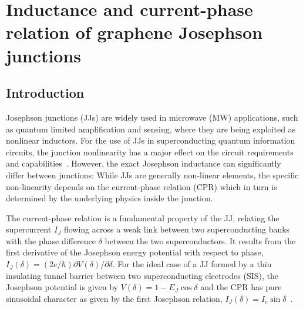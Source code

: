 \newchapstyle
\chapter{Inductance and current-phase relation of graphene Josephson junctions}
\label{chap:gJJ-CPR}


\begin{abstract}
	We perform extensive analysis of graphene Josephson junctions embedded in microwave circuits.
	By comparing a diffusive junction at \SI{15}{\milli\kelvin} with a ballistic one at \SI{15}{\milli\kelvin} and \SI{1}{\kelvin}, we are able to reconstruct the current-phase relation.
\end{abstract}

\afterpage{\pagecolor{none}}\newpage

\section{Introduction}

Josephson junctions (JJs) are widely used in microwave (MW) applications, such as quantum limited amplification and sensing, where they are being exploited as nonlinear inductors.
%
For the use of JJs in superconducting quantum information circuits, the junction nonlinearity has a major effect on the circuit requirements and capabilities~\cite{kringhojAnharmonicitySuperconductingQubit2018}.
%
However, the exact Josephson inductance can significantly differ between junctions:
%
While JJs are generally non-linear elements, the specific non-linearity depends on the current-phase relation (CPR) which in turn is determined by the underlying physics inside the junction.

The current-phase relation is a fundamental property of the JJ, relating the supercurrent $I_J$ flowing across a weak link between two superconducting banks with the phase difference $\delta$ between the two superconductors.
%
It results from the first derivative of the Josephson energy potential with respect to phase, $I_J(\delta) = (2e/\hbar) \partial V(\delta)/\partial \delta$.
%
For the ideal case of a JJ formed by a thin insulating tunnel barrier between two superconducting electrodes (SIS), the Josephson potential is given by $V(\delta)=1-E_J\cos\delta$ and the CPR has pure sinusoidal character as given by the first Josephson relation, $I_J(\delta) = I_c\sin\delta$~\cite{josephsonPossibleNewEffects1962,josephsonSupercurrentsBarriers1965}.

